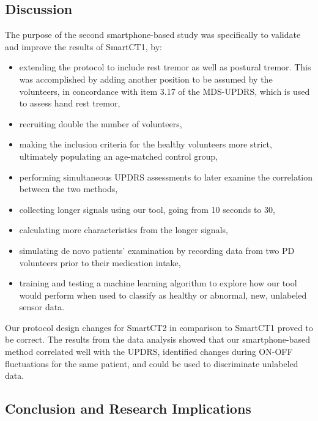 \subsection{Discussion}
\label{subsec:SmartCT2Discussion}
The purpose of the second smartphone-based study was specifically to validate and improve the results of \gls{SmartCT1}, by:

\begin{itemize}
\item extending the protocol to include rest tremor as well as postural tremor. This was accomplished by adding another position to be assumed by the volunteers, in concordance with item 3.17 of the \gls{MDS}-\gls{UPDRS}, which is used to assess hand rest tremor,
\item recruiting double the number of volunteers,
\item making the inclusion criteria for the healthy volunteers more strict, ultimately populating an age-matched control group,
\item performing simultaneous \gls{UPDRS} assessments to later examine the correlation between the two methods,
\item collecting longer signals using our tool, going from 10 seconds to 30, 
\item calculating more characteristics from the longer signals,
\item simulating de novo patients' examination by recording data from two \gls{PD} volunteers prior to their medication intake,
\item training and testing a machine learning algorithm to explore how our tool would perform when used to classify as healthy or abnormal, new, unlabeled sensor data. 
\end{itemize}

\noindent
Our protocol design changes for \gls{SmartCT2} in comparison to \gls{SmartCT1} proved to be correct. The results from the data analysis showed that our smartphone-based method correlated well with the \gls{UPDRS}, identified changes during ON-OFF fluctuations for the same patient, and could be used to discriminate unlabeled data. 



\subsection{Conclusion and Research Implications}
\label{subsubsec:PenImplications}

